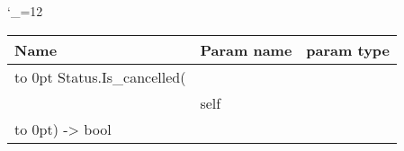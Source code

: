 \begingroup \catcode`\_=12 \tt
\begin{tabular}{lll}
\toprule
\textrm{Name}&\textrm{Param name}&\textrm{param type}\\
\midrule
\hbox to 0pt {Status.Is_cancelled(\hss}\\
& self\\
\hbox to 0pt{) -> bool\hss}\\
\bottomrule
\end{tabular}
\endgroup

